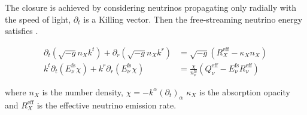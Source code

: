 %
%
The closure is achieved by considering neutrinos propagating only radially with the 
speed of light, $\partial_t$ is a Killing vector. 
Then the free-streaming neutrino energy satisfies \cite{Radice:2016dwd,Radice:2018pdn}.

\begin{subequations}
    \begin{align}
        \partial_t(\sqrt{-g}n_X k^t) + \partial_r(\sqrt{-g}n_X k^r) &= \sqrt{-g}(R^{\text{eff}}_{X} - \kappa_X n_X) \label{eq:theory:neut:balanseq1} \\
        k^t\partial_t(E_{\nu}^{\text{fs}}\chi) + k^r\partial_r(E_{\nu}^{\text{fs}}\chi) &= \frac{\chi}{n_{\nu}^{\text{fs}}} (Q_{\nu}^{\text{eff}} - E_{\nu}^{\text{fs}}R_{\nu}^{\text{eff}}) \label{eq:theory:neut:balanseq2} 
    \end{align}
\end{subequations}

where $n_X$ is the number density, $\chi=-k^{\alpha}(\partial_t)_{\alpha}$
$\kappa_X$ is the absorption opacity and $R_X^{\text{eff}}$ 
is the effective neutrino emission rate.

%
%
%

